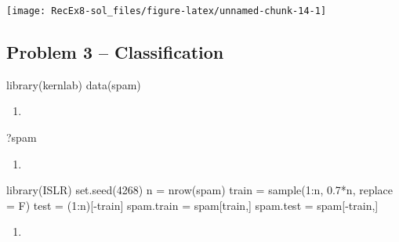 \documentclass[
]{article}
\newenvironment{Shaded}{\begin{snugshade}}{\end{snugshade}}
\newcommand{\AttributeTok}[1]{\textcolor[rgb]{0.77,0.63,0.00}{#1}}
\newcommand{\DecValTok}[1]{\textcolor[rgb]{0.00,0.00,0.81}{#1}}
\newcommand{\FloatTok}[1]{\textcolor[rgb]{0.00,0.00,0.81}{#1}}
\newcommand{\FunctionTok}[1]{\textcolor[rgb]{0.00,0.00,0.00}{#1}}
\newcommand{\NormalTok}[1]{#1}
\newcommand{\OtherTok}[1]{\textcolor[rgb]{0.56,0.35,0.01}{#1}}
\newcommand{\SpecialCharTok}[1]{\textcolor[rgb]{0.00,0.00,0.00}{#1}}
\providecommand{\tightlist}{%
  \setlength{\itemsep}{0pt}\setlength{\parskip}{0pt}}
\begin{document}
\texttt{[image: RecEx8-sol\_files/figure-latex/unnamed-chunk-14-1]}

\hypertarget{problem-3-classification}{%
\subsection{Problem 3 --
Classification}\label{problem-3-classification}}

\begin{Shaded}
\begin{Highlighting}[]
\FunctionTok{library}\NormalTok{(kernlab)}
\FunctionTok{data}\NormalTok{(spam)}
\end{Highlighting}
\end{Shaded}

\begin{enumerate}
\def\labelenumi{\alph{enumi})}
\tightlist
\item
\end{enumerate}

\begin{Shaded}
\begin{Highlighting}[]
\NormalTok{?spam}
\end{Highlighting}
\end{Shaded}

\begin{enumerate}
\def\labelenumi{\alph{enumi})}
\setcounter{enumi}{1}
\tightlist
\item
\end{enumerate}

\begin{Shaded}
\begin{Highlighting}[]
\FunctionTok{library}\NormalTok{(ISLR)}
\FunctionTok{set.seed}\NormalTok{(}\DecValTok{4268}\NormalTok{)}
\NormalTok{n }\OtherTok{=} \FunctionTok{nrow}\NormalTok{(spam)}
\NormalTok{train }\OtherTok{=} \FunctionTok{sample}\NormalTok{(}\DecValTok{1}\SpecialCharTok{:}\NormalTok{n, }\FloatTok{0.7}\SpecialCharTok{*}\NormalTok{n, }\AttributeTok{replace =}\NormalTok{ F)}
\NormalTok{test }\OtherTok{=}\NormalTok{ (}\DecValTok{1}\SpecialCharTok{:}\NormalTok{n)[}\SpecialCharTok{{-}}\NormalTok{train]}
\NormalTok{spam.train }\OtherTok{=}\NormalTok{ spam[train,]}
\NormalTok{spam.test }\OtherTok{=}\NormalTok{ spam[}\SpecialCharTok{{-}}\NormalTok{train,]}
\end{Highlighting}
\end{Shaded}

\begin{enumerate}
\def\labelenumi{\alph{enumi})}
\setcounter{enumi}{2}
\tightlist
\item
\end{enumerate}
\end{document}
